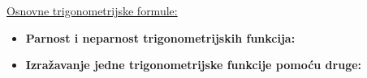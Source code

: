 \documentclass[10pt,oneside,a4paper]{report}
\begin{document}
\noindent
{\large \textsf{\underline{Osnovne trigonometrijske formule:}}}\\
\hspace*{30mm}	
		\hspace{5mm}
		\hspace{5mm}

\newpage
\noindent
\begin{itemize}
	\item \textbf{\textsf{Parnost i neparnost trigonometrijskih funkcija:}}\\
		\hspace{5mm}
		\hspace{5mm}
		\hspace{5mm}
	\item \textbf{\textsf{Izra\v{z}avanje jedne trigonometrijske funkcije pomo\'{c}u druge:}}\\

\end{itemize}
\end{document}
